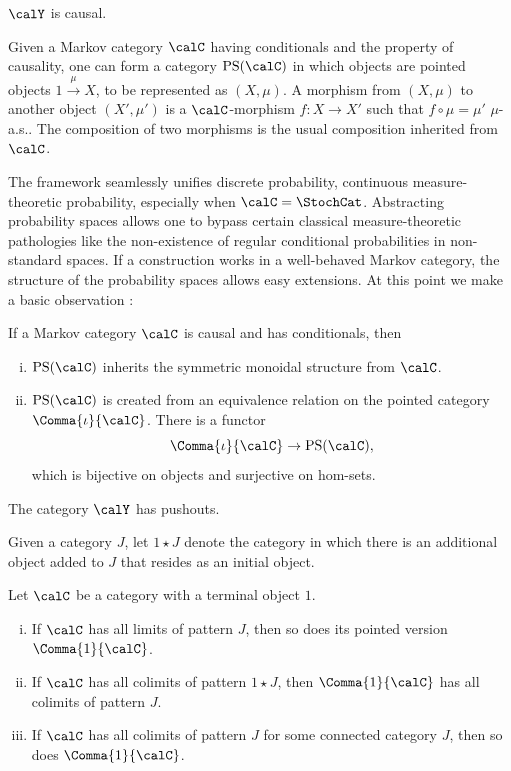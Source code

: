 \documentclass[12pt,oneside,pb-diagram]{article}
\begin{document}
\begin{Assumption} \label{A:causal}
	$\calY$ is causal.
\end{Assumption}

\begin{definition}
	\cite[Def 13.8]{fritz2020Stoch}  Given a Markov category $\calC$ having conditionals and the property of causality, one can form a category $\text{PS}(\calC)$ in which objects are pointed objects $1 \xrightarrow{\mu} X$, to be represented as $(X,\mu)$. A morphism from $(X,\mu)$ to another object $(X',\mu')$ is a $\calC$-morphism $f:X\to X'$ such that $f\circ \mu = \mu'$ $\mu$-a.s.. The composition of two morphisms is the usual composition inherited from $\calC$.
\end{definition}

The framework seamlessly unifies discrete probability, continuous measure-theoretic probability, especially when $\calC = \StochCat$.  Abstracting probability spaces allows one to bypass certain classical measure-theoretic pathologies like the non-existence of regular conditional probabilities in non-standard spaces. If a construction works in a well-behaved Markov category, the structure of the probability spaces allows easy extensions. At this point we make a basic observation :

\begin{lemma}
	\cite[Def 13.8]{fritz2020Stoch}  If a Markov category $\calC$ is causal and has conditionals, then
	\begin{enumerate} [(i)]
		\item $\text{PS}(\calC)$ inherits the symmetric monoidal structure from $\calC$.
		\item $\text{PS}(\calC)$ is created from an equivalence relation on the pointed category $\Comma{\iota}{\calC}$. There is a functor 
		\[ \Comma{\iota}{\calC} \to \text{PS}(\calC) , \]
		which is bijective on objects and surjective on hom-sets.
	\end{enumerate}
\end{lemma}

\begin{Assumption} \label{A:pushout}
	The category $\calY$ has pushouts.
\end{Assumption}

Given a category $J$, let $1 \star J$ denote the category in which there is an additional object added to $J$ that resides as an initial object.

\begin{lemma}  \label{lem:jd9ps3}
	Let $\calC$ be a category with a terminal object $1$.
	\begin{enumerate} [(i)]
		\item If $\calC$ has all limits of pattern $J$, then so does its pointed version $\Comma{1}{\calC}$.
		\item If $\calC$ has all colimits of pattern $1\star J$, then $\Comma{1}{\calC}$ has all colimits of pattern $J$.
		\item If $\calC$ has all colimits of pattern $J$ for some connected category $J$, then so does $\Comma{1}{\calC}$.
	\end{enumerate}
\end{lemma}
\end{document}
